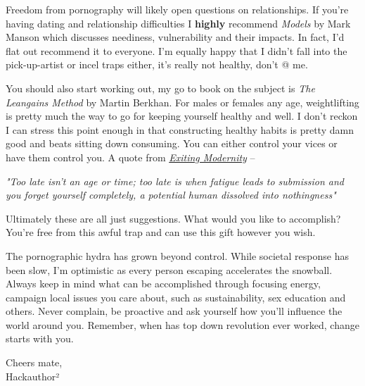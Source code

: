 \documentclass[easypeasy.tex]{subfiles}
\begin{document}
Freedom from pornography will likely open questions on relationships. If you're having dating and relationship difficulties I \textbf{highly} recommend \textit{Models} by Mark Manson which discusses neediness, vulnerability and their impacts. In fact, I'd flat out recommend it to everyone. I'm equally happy that I didn't fall into the pick-up-artist or incel traps either, it's really not healthy, don't @ me.

You should also start working out, my go to book on the subject is \textit{The Leangains Method} by Martin Berkhan. For males or females any age, weightlifting is pretty much the way to go for keeping yourself healthy and well. I don't reckon I can stress this point enough in that constructing healthy habits is pretty damn good and beats sitting down consuming. You can either control your vices or have them control you. A quote from \href{https://www.meta-nomad.net/exiting-modernity/}{\textit{Exiting Modernity}} --

\hspace{\parindent} \textit{"Too late isn’t an age or time; too late is when fatigue leads to submission and you forget yourself completely, a potential human dissolved into nothingness"}

Ultimately these are all just suggestions. What would you like to accomplish? You're free from this awful trap and can use this gift however you wish.

The pornographic hydra has grown beyond control. While societal response has been slow, I'm optimistic as every person escaping accelerates the snowball. Always keep in mind what can be accomplished through focusing energy, campaign local issues you care about, such as sustainability, sex education and others. Never complain, be proactive and ask yourself how you'll influence the world around you. Remember, when has top down revolution ever worked, change starts with you.

Cheers mate, \\
Hackauthor²
\end{document}
